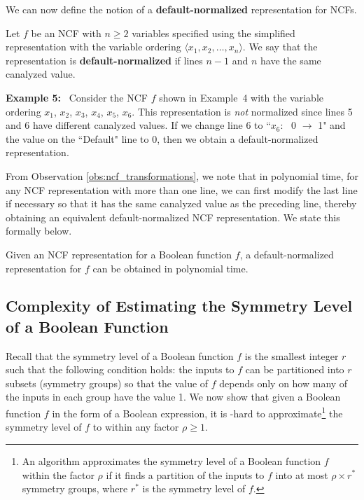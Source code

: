 
\medskip
We can now define the notion of a \textbf{default-normalized} 
representation for NCFs.

\begin{definition}
\label{def:normalized}
Let $f$ be an NCF with $n \geq 2$ variables specified using
the simplified representation with 
the variable ordering $\langle x_1, x_2, \ldots, x_n\rangle$.
We say that the representation is {\bf default-normalized} if
lines $n-1$ and $n$ have the same canalyzed value.
\end{definition}

\noindent
\textbf{Example 5:}~ 
Consider the NCF $f$ shown in Example~4 with
the variable ordering $x_1$, $x_2$, $x_3$, $x_4$, $x_5$, $x_6$.
This representation is \emph{not} normalized since lines 5 and 6
have different canalyzed values.
If we change line 6 to ``$x_6$:~ 0 $\longrightarrow$ 1" and the
value on the ``Default" line to 0, then we obtain 
a default-normalized representation. 

\medskip
From Observation \ref{obs:ncf_transformations},
we note that in polynomial time, for any NCF representation with more than one line,
we can first modify the last line if necessary 
so that it has the same canalyzed value as the preceding line,
thereby obtaining an equivalent default-normalized NCF representation.
We state this formally below.

\begin{observation}\label{obs:normalization_poly}
Given an NCF representation for a Boolean function $f$, a default-normalized
representation for $f$ can be obtained in polynomial time. \QED
\end{observation}

\subsection{Complexity of Estimating the Symmetry Level of a 
Boolean Function}
\label{sse:symmetry_level_hardness}

Recall that the symmetry level of a Boolean function $f$ is the smallest
integer $r$ such that the following condition holds:
the  inputs to $f$ can be partitioned into $r$ subsets 
(symmetry groups) so that the value of $f$ depends only on 
how many of the inputs in each group have the value 1.
We now show that given a Boolean function $f$
in the form of a Boolean expression, it is \cnp-hard to 
approximate\footnote{An algorithm approximates the symmetry
level of a Boolean function $f$ within the factor $\rho$ if it finds a
partition of the inputs to $f$ into at most $\rho \times r^*$ symmetry
groups, where $r^*$ is the symmetry level of $f$.}
the symmetry level of $f$ to within any factor $\rho \geq 1$.

